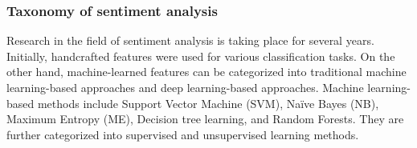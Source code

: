 \subsubsection{Taxonomy of sentiment analysis}

Research in the field of sentiment analysis is taking place for several years. Initially, handcrafted features were used for various classification tasks. On the other hand, machine-learned features can be categorized into traditional machine learning-based approaches and deep learning-based approaches. Machine learning-based methods include Support Vector Machine (SVM), Naïve Bayes (NB), Maximum Entropy (ME), Decision tree learning, and Random Forests. They are further categorized into supervised and unsupervised learning methods.